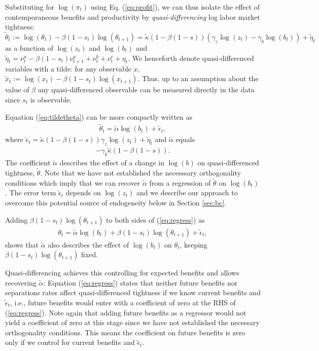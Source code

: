 \documentclass[12pt]{article}
\newcommand{\1}{\mathbf{1}}
\newcommand{\beq}{\begin{eqnarray}}
\newcommand{\eeq}{\end{eqnarray}}
\begin{document}
Substituting for $\log(\pi_{t})$ using Eq. (\ref{eq:profit}), we can thus isolate the effect of contemporaneous benefits and productivity by \emph{quasi-differencing} log labor market tightness:
\begin{equation} \label{eq:tildetheta}
 \tilde{\theta}_t  :=\log(\theta_t) - \beta (1-s_t) \log(\theta_{t+1}) =\tilde{\kappa}  (1-\beta (1-s)) (\gamma_z \log(z_t) - \gamma_b \log(b_t))  + \tilde{\eta}_t
\end{equation}
as a function of $\log(z_t)$ and $\log(b_t)$ and $ \tilde{\eta}_t = \nu^a_t - \beta (1-s_t) \nu^a_{t+1} + \nu^b_t + \nu^c_t + \eta_t$. We henceforth denote quasi-differenced variables with a tilde: for any observable $x$, $\tilde{x}_t:=\log(x_t)-\beta(1-s_t)\log(x_{t+1})$. Thus, up to an assumption about the value of $\beta$ any quasi-differenced observable can be measured directly in the data since $s_t$ is observable.


Equation (\ref{eq:tildetheta}) can be more compactly written as 
\beq \label{eq:regress}
\tilde{\theta}_t = \tilde{\alpha} \log(b_t) + \tilde{\epsilon}_t,
\eeq  
where $\tilde{\epsilon}_t =  \tilde{\kappa}  (1-\beta (1-s)) \gamma_z \log(z_t) + \tilde{\eta}_t$ and  $\tilde{\alpha}$ equals
\beq
- \gamma_b \tilde{\kappa} (1-\beta (1-s)). \label{eq:alpha1}
\eeq
The coefficient $\tilde{\alpha}$ describes the effect of a change in $\log(b)$ on quasi-differenced tightness, $\tilde{\theta}$. Note that we have not established the necesssary orthogonality conditions which imply that we can recover $\tilde{\alpha}$ from a regression of $\tilde{\theta}$ on $\log(b_t)$. 
The error term $\tilde{\epsilon}_t$ depends on $\log(z_t)$ and we describe our approach to overcome this potential source of endogeneity below in Section \ref{sec:bc}. 

Adding $\beta (1-s_t) \log(\theta_{t+1})$ to both sides of (\ref{eq:regress}) as
\beq
\theta_t = \tilde{\alpha} \log(b_t) + \beta (1-s_t) \log(\theta_{t+1}) + \tilde{\epsilon}_t,
\eeq
shows that $\tilde{\alpha}$ also describes the effect of $\log(b_t)$ on $\theta_t$, keeping $\beta (1-s_t) \log(\theta_{t+1})$ fixed.

Quasi-differencing achieves this controlling for expected benefits and allows recovering $\tilde{\alpha}$:  Equation (\ref{eq:regress}) states that neither future benefits nor separations rates affect quasi-differenced tightness if we know current benefits and $\tilde{\epsilon}_t$, i.e., future benefits would enter with a coefficient of zero at the RHS of (\ref{eq:regress}). Note again that adding future benefits as a regressor 
would not yield a coefficient of zero at this stage since we have not established the necessary orthogonality conditions. This means the coefficient on future benefits is zero only if we control for current benefits and $\tilde{\epsilon}_t$.
\end{document}
